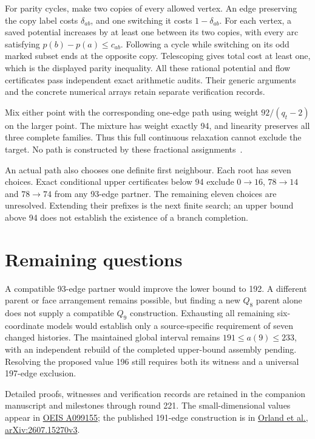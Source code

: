 \documentclass[11pt,a4paper]{article}
\begin{document}
For parity cycles, make two copies of every allowed vertex. An edge
preserving the copy label costs $\delta_{ab}$, and one switching it
costs $1-\delta_{ab}$. For each vertex, a saved potential increases
by at least one between its two copies, with every arc satisfying
$p(b)-p(a)\le c_{ab}$. Following a cycle while switching on its odd
marked subset ends at the opposite copy. Telescoping gives total cost
at least one, which is the displayed parity inequality.
All these rational potential and flow certificates pass independent
exact arithmetic audits. Their generic arguments and the concrete
numerical arrays retain separate verification records.

Mix either point with the corresponding one-edge path using weight
$92/(q_t-2)$ on the larger point. The mixture has weight exactly 94,
and linearity preserves all three complete families. Thus this full
continuous relaxation cannot exclude the target. No path is constructed
by these fractional assignments~\cite{research220,research221}.

An actual path also chooses one definite first neighbour. Each root
has seven choices. Exact conditional upper certificates below 94 exclude
$0\to16$, $78\to14$ and $78\to74$ from any 93-edge partner.
The remaining eleven choices are unresolved. Extending their prefixes
is the next finite search; an upper bound above 94 does not establish
the existence of a branch completion.

\section{Remaining questions}
A compatible 93-edge partner would improve the lower bound to 192.
A different parent or face arrangement remains possible, but finding a
new $Q_8$ parent alone does not supply a compatible $Q_9$ construction.
Exhausting all remaining six-coordinate models would establish only a
source-specific requirement of seven changed histories.
The maintained global interval remains $191\le a(9)\le233$, with an
independent rebuild of the completed upper-bound assembly pending.
Resolving the proposed value 196 still requires both its witness and
a universal 197-edge exclusion.

\smallskip
{\small Detailed proofs, witnesses and verification records are retained
in the companion manuscript and milestones through round 221.
The small-dimensional values appear in
\href{https://oeis.org/A099155}{OEIS A099155}; the published 191-edge
construction is in
\href{https://arxiv.org/html/2607.15270v3}{Orland et al., arXiv:2607.15270v3}.}
\end{document}
